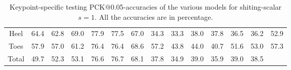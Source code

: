 \documentclass[./main.tex]{subfiles}
\begin{document}
\begin{table}[htbp]
\begin{adjustbox}{center}
\begin{tabular}{c||ccc|ccc|ccc|ccc|c}
            Heel & 64.4 & 62.8 & 69.0 & 77.9 & 77.5 & 67.0 & 34.3 & 33.3 & 38.0 & 37.8 & 36.5 & 36.2 & 52.9 \\
            Toes & 57.9 & 57.0 & 61.2 & 76.4 & 76.4 & 68.6 & 57.2 & 43.8 & 44.0 & 40.7 & 51.6 & 53.0 & 57.3 \\
            \hline
            Total & 49.7 & 52.3 & 53.1 & 76.6 & 76.7 & 68.1 & 37.8 & 34.9 & 39.0 & 35.9 & 39.0 & 38.5 & \\
            \hline
        \end{tabular}
        \caption{Keypoint-specific testing PCK@0.05-accuracies of the various models for shiting-scalar $s = 1$. All the accuracies are in percentage.}
        \label{tab:finetune_kpts_test_accs_05_1}
    \end{adjustbox}
\end{table}
\end{document}
